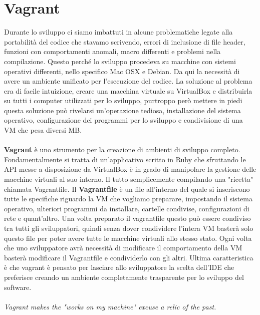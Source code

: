 \documentclass[italian]{tktltiki2}
\begin{document}
\section{Vagrant}
Durante lo sviluppo ci siamo imbattuti in alcune problematiche
legate alla portabilità del codice che stavamo scrivendo, errori di inclusione di file header, funzioni con comportamenti anomali, macro differenti e problemi nella compilazione. Questo perché lo sviluppo procedeva su macchine con sistemi operativi differenti, nello specifico Mac OSX e Debian. Da qui la necessità di avere un ambiente unificato per l'esecuzione del codice. La soluzione al problema era di facile intuizione, creare una macchina virtuale su VirtualBox e distribuirla su tutti i computer utilizzati per lo sviluppo, purtroppo però mettere in piedi questa soluzione può rivelarsi un'operazione tediosa, installazione del sistema operativo, configurazione dei programmi per lo sviluppo e condivisione di una VM che pesa diversi MB.\\\\
\textbf{Vagrant}\cite{vagrant} è uno strumento per la creazione di ambienti di sviluppo completo. Fondamentalmente si tratta di un’applicativo scritto in Ruby che sfruttando le API messe a disposizione da VirtualBox è in grado di manipolare la gestione delle macchine virtuali al suo interno. Il tutto semplicemente compilando una "ricetta" chiamata Vagrantfile. Il \textbf{Vagrantfile} è un file all’interno del quale si inseriscono tutte le specifiche riguardo la VM che vogliamo preparare, impostando il sistema operativo, ulteriori programmi da installare, cartelle condivise, configurazioni di rete e quant'altro. Una volta preparato il vagrantfile questo può essere condiviso tra tutti gli sviluppatori, quindi senza dover condividere l'intera VM basterà solo questo file per poter avere tutte le macchine virtuali allo stesso stato. Ogni volta che uno sviluppatore avrà necessità di modificare il comportamento della VM basterà modificare il Vagrantfile e condividerlo con gli altri. Ultima caratteristica è che vagrant è pensato per lasciare allo sviluppatore la scelta dell'IDE che preferisce creando un ambiente completamente trasparente per lo sviluppo del software.\\\\
\emph{Vagrant makes the "works on my machine" excuse a relic of the past.}

\newpage
\end{document}
